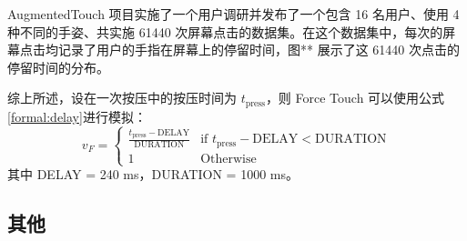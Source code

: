 AugmentedTouch \cite{Changkun:2016} 项目实施了一个用户调研并发布了一个包含 16 名用户、使用 4 种不同的手姿、共实施 61440 次屏幕点击的数据集。在这个数据集中，每次的屏幕点击均记录了用户的手指在屏幕上的停留时间，图** 展示了这 61440 次点击的停留时间的分布。



综上所述，设在一次按压中的按压时间为 $t_{\text{press}}$，则 Force Touch 可以使用公式\ref{formal:delay}进行模拟：
\begin{equation}
v_{F} =
    \begin{cases}
        \frac{t_{\text{press}}-\text{DELAY}}{\text{DURATION}}
             & \mbox{if $t_{\text{press}}-\text{DELAY}< \text{DURATION}$} \\
        1    & \mbox{Otherwise}
    \end{cases}
\label{formal:delay}
\end{equation}
其中 DELAY = 240 ms，DURATION = 1000 ms。

\subsection{其他}
